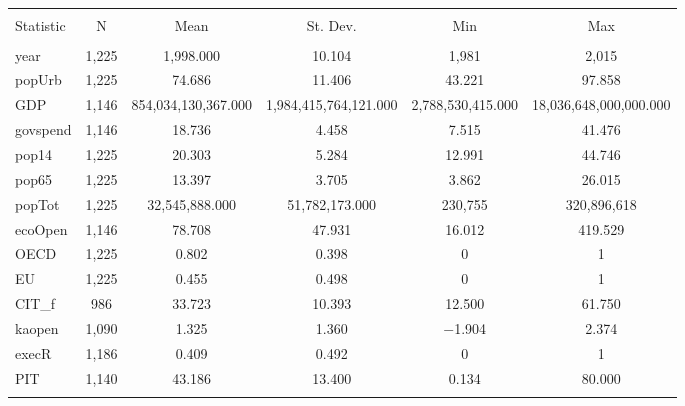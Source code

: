
\begin{table}[!htbp] \centering 
  \caption{} 
  \label{} 
\begin{tabular}{@{\extracolsep{5pt}}lccccc} 
\\[-1.8ex]\hline \\[-1.8ex] 
Statistic & \multicolumn{1}{c}{N} & \multicolumn{1}{c}{Mean} & \multicolumn{1}{c}{St. Dev.} & \multicolumn{1}{c}{Min} & \multicolumn{1}{c}{Max} \\ 
\hline \\[-1.8ex] 
year & 1,225 & 1,998.000 & 10.104 & 1,981 & 2,015 \\ 
popUrb & 1,225 & 74.686 & 11.406 & 43.221 & 97.858 \\ 
GDP & 1,146 & 854,034,130,367.000 & 1,984,415,764,121.000 & 2,788,530,415.000 & 18,036,648,000,000.000 \\ 
govspend & 1,146 & 18.736 & 4.458 & 7.515 & 41.476 \\ 
pop14 & 1,225 & 20.303 & 5.284 & 12.991 & 44.746 \\ 
pop65 & 1,225 & 13.397 & 3.705 & 3.862 & 26.015 \\ 
popTot & 1,225 & 32,545,888.000 & 51,782,173.000 & 230,755 & 320,896,618 \\ 
ecoOpen & 1,146 & 78.708 & 47.931 & 16.012 & 419.529 \\ 
OECD & 1,225 & 0.802 & 0.398 & 0 & 1 \\ 
EU & 1,225 & 0.455 & 0.498 & 0 & 1 \\ 
CIT\_f & 986 & 33.723 & 10.393 & 12.500 & 61.750 \\ 
kaopen & 1,090 & 1.325 & 1.360 & $-$1.904 & 2.374 \\ 
execR & 1,186 & 0.409 & 0.492 & 0 & 1 \\ 
PIT & 1,140 & 43.186 & 13.400 & 0.134 & 80.000 \\ 
\hline \\[-1.8ex] 
\end{tabular} 
\end{table} 
